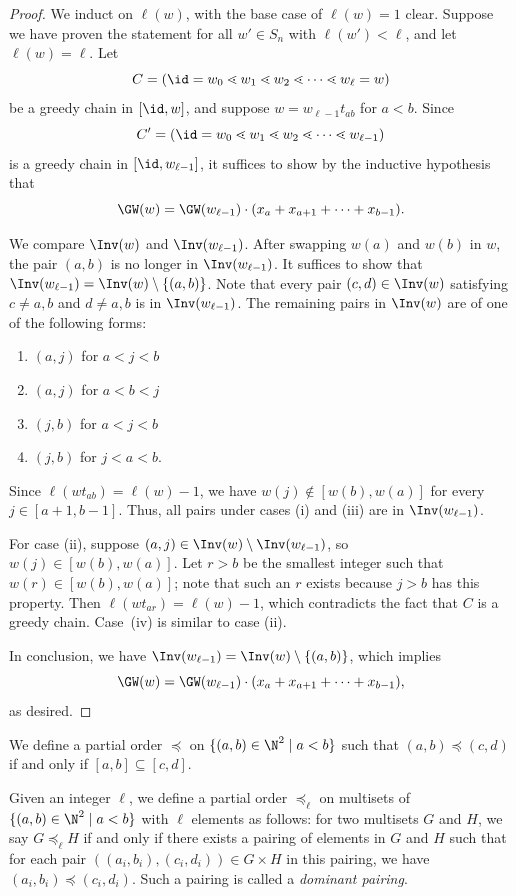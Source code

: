 \begin{proof}
   We induct on $\ell(w)$, with the base case of $\ell(w) = 1$ clear. Suppose we have proven the statement for all $w'\in S_n$ with $\ell(w') < \ell$, and let $\ell(w) = \ell$. Let 
    \[C=(\id=w_0\lessdot w_1\lessdot w_2\lessdot \dots \lessdot w_{\ell} =w)\] 
    be a greedy chain in $[\id,w]$, and suppose $w=w_{\ell-1}t_{ab}$ for $a < b$. Since
    \[C'=(\id=w_0\lessdot w_1\lessdot w_2\lessdot \dots \lessdot w_{\ell-1})\] 
    is a greedy chain in $[\id, w_{\ell-1}]$, it suffices to show by the inductive hypothesis that
    \[\GW(w)=\GW(w_{\ell-1})\cdot (x_{a}+x_{a+1}+\dots+x_{b-1}).\]
    
    We compare $\Inv(w)$ and $\Inv(w_{\ell-1})$. After swapping $w(a)$ and $w(b)$ in $w$, the pair $(a, b)$ is no longer in $\Inv(w_{\ell-1})$. It suffices to show that $\Inv(w_{\ell-1})=\Inv(w)\setminus \{(a,b)\}$. Note that every pair $(c,d)\in \Inv(w)$ satisfying $c\neq a, b$ and $d\neq a, b$ is in $\Inv(w_{\ell-1})$. The remaining pairs in $\Inv(w)$ are of one of the following forms:
    \begin{enumerate}[label=\textnormal{(\roman*)}]
        \item $(a,j)$ for $a<j<b$
        \item $(a,j)$ for $a<b<j$
        \item $(j,b)$ for $a<j<b$
        \item $(j,b)$ for $j<a<b$.
    \end{enumerate}

    Since $\ell(wt_{ab})=\ell(w)-1$, we have $w(j)\notin [w(b),w(a)]$ for every $j\in [a+1,b-1]$. Thus, all pairs under cases (i) and (iii) are in $\Inv(w_{\ell-1})$.

    For case (ii), suppose $(a,j)\in \Inv(w)\setminus \Inv(w_{\ell-1})$, so $w(j)\in [w(b),w(a)]$. Let $r > b$ be the smallest integer such that $w(r)\in [w(b), w(a)]$; note that such an $r$ exists because $j > b$ has this property. Then $\ell(wt_{ar})=\ell(w)-1$, which contradicts the fact that $C$ is a greedy chain. Case~(iv) is similar to case (ii).

    In conclusion, we have $\Inv(w_{\ell-1})=\Inv(w)\setminus \{(a,b)\}$, which implies
    \[\GW(w)=\GW(w_{\ell-1})\cdot (x_{a}+x_{a+1}+\dots+x_{b-1}),\] as desired.
\end{proof}


\begin{defi}\label{def:dominant pairing}
    We define a partial order $\preceq$ on $\{(a,b)\in \N^2\mid a<b\}$ such that $(a,b)\preceq (c,d)$ if and only if $[a,b]\subseteq [c,d]$. 

    Given an integer $\ell$, we define a partial order $\preceq_{\ell}$ on multisets of $\{(a,b)\in \N^2\mid a<b\}$ with $\ell$ elements as follows: for two multisets $G$ and $H$, we say $G \preceq_{\ell} H$ if and only if there exists a pairing of elements in $G$ and $H$ such that for each pair $((a_i,b_i),(c_i,d_i))\in G\times H$ in this pairing, we have $(a_i,b_i)\preceq (c_i,d_i)$. Such a pairing is called a \emph{dominant pairing}.
\end{defi}


